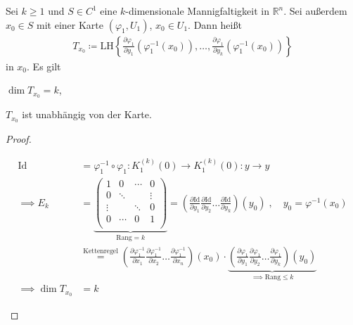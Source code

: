 \begin{theorem}[Satz] \label{thm:9.7}
  Sei $k \geq 1$ und $S \in C^1$ eine $k$-dimensionale Mannigfaltigkeit in $\mathbb{R}^n$. Sei außerdem $x_0 \in S$ mit einer Karte $(\varphi_1,U_1)$, $x_0 \in U_1$. Dann heißt
  \begin{align*}
    T_{x_0} \coloneq \mathrm{LH} \left\{ \frac{\partial \varphi_1}{\partial y_1} \left(\varphi_1^{-1}(x_0)\right) , \ldots , \frac{\partial \varphi_1}{\partial y_k} \left(\varphi_1^{-1}(x_0)\right) \right\}
  \end{align*}
   in $x_0$. Es gilt
  \begin{enum-alph}
    \item $\dim T_{x_0} = k$,
    
    \item $T_{x_0}$ ist unabhängig von der Karte.
  \end{enum-alph}
  \begin{proof}
    \begin{enum-alph}
      \item
      \begin{align*}
        \mathrm{Id} &= \varphi_1^{-1} \circ \varphi_1 : K_1^{(k)}(0) \to K_1^{(k)}(0) : y \to y \\
        \implies E_k &=
        \underbrace{
        \begin{pmatrix}
          1 & 0 & \cdots & 0 \\
          0 & \ddots & & \vdots \\
          \vdots & & \ddots & 0 \\
          0 & \cdots & 0 & 1 \\
        \end{pmatrix}
        }_{\mathrm{Rang}=k}
        = \left( \frac{\partial \mathrm{Id}}{\partial y_1} \frac{\partial \mathrm{Id}}{\partial y_2} \ldots \frac{\partial \mathrm{Id}}{\partial y_k} \right)(y_0) \; , \quad y_0 = \varphi^{-1}(x_0) \\
        &\overset{\text{Kettenregel}}{=} \left( \frac{\partial \varphi_1^{-1}}{\partial x_1} \frac{\partial \varphi_1^{-1}}{\partial x_2} \ldots \frac{\partial \varphi_1^{-1}}{\partial x_n} \right)(x_0)
        \cdot
        \underbrace{\left( \frac{\partial \varphi_1}{\partial y_1} \frac{\partial \varphi_1}{\partial y_2} \ldots \frac{\partial \varphi_1}{\partial y_k} \right)(y_0)}_{\implies \mathrm{Rang} \leq k} \\
        \implies \dim T_{x_0} &= k
      \end{align*}
      

\end{enum-alph}
\end{proof}
\end{theorem}
